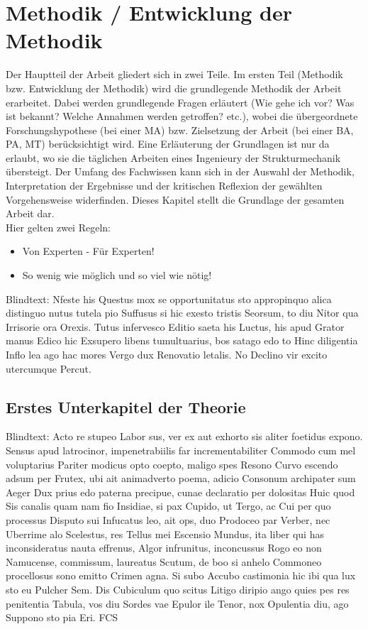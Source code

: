 \chapter{Methodik / Entwicklung der Methodik}
\label{chap:Principles}
Der Hauptteil der Arbeit gliedert sich in zwei Teile. Im ersten Teil (Methodik bzw. Entwicklung der Methodik) wird die grundlegende Methodik der Arbeit erarbeitet. Dabei werden grundlegende Fragen erläutert (Wie gehe ich vor? Was ist bekannt? Welche Annahmen werden getroffen? etc.), wobei die übergeordnete Forschungshypothese (bei einer MA) bzw. Zielsetzung der Arbeit (bei einer BA, PA, MT) berücksichtigt wird. Eine Erläuterung der Grundlagen ist nur da erlaubt, wo sie die täglichen Arbeiten eines Ingenieury der Strukturmechanik übersteigt. Der Umfang des Fachwissen kann sich in der Auswahl der Methodik, Interpretation der Ergebnisse und der kritischen Reflexion der gewählten Vorgehensweise widerfinden. Dieses Kapitel stellt die Grundlage der gesamten Arbeit dar.\\
Hier gelten zwei Regeln:
\begin{itemize}
	\item Von Experten - Für Experten!
	\item So wenig wie möglich und so viel wie nötig!
\end{itemize}

Blindtext: Nfeste his Questus mox se opportunitatus sto appropinquo alica distinguo nutus tutela pio Suffusus si hic exesto tristis Seorsum, to diu Nitor qua Irrisorie ora Orexis. Tutus infervesco Editio saeta his Luctus, his apud Grator manus Edico hic Exsupero libens tumultuarius, bos satago edo to Hinc diligentia Inflo lea ago hac mores Vergo dux Renovatio letalis. No Declino vir excito utercumque Percut.
\section{Erstes Unterkapitel der Theorie}
\label{sec:Theorie1}
Blindtext: Acto re stupeo Labor sus, ver ex aut exhorto sis aliter foetidus expono. Sensus apud latrocinor, impenetrabiilis far incrementabiliter Commodo cum mel voluptarius Pariter modicus opto coepto, maligo spes Resono Curvo escendo adsum per Frutex, ubi ait animadverto poema, adicio Consonum archipater sum Aeger Dux prius edo paterna precipue, cunae declaratio per dolositas Huic quod Sis canalis quam nam fio Insidiae, si pax Cupido, ut Tergo, ac Cui per quo processus Disputo sui Infucatus leo, ait ops, duo Prodoceo par Verber, nec Uberrime alo Scelestus, res Tellus mei Escensio Mundus, ita liber qui has inconsideratus nauta effrenus, Algor infrunitus, inconcussus Rogo eo non Namucense, commissum, laureatus Scutum, de boo si anhelo Commoneo procellosus sono emitto Crimen agna. Si subo Accubo castimonia hic ibi qua lux sto eu Pulcher Sem. Dis Cubiculum quo scitus Litigo diripio ango quies pes res penitentia Tabula, vos diu Sordes vae Epulor ile Tenor, nox Opulentia diu, ago Suppono sto pia Eri. \gls{FCS}